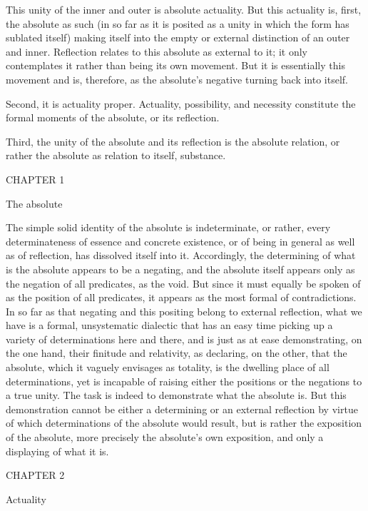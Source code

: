 This unity of the inner and outer is absolute actuality.
But this actuality is, first, the absolute as such
(in so far as it is posited as a unity
in which the form has sublated itself)
making itself into the empty or external
distinction of an outer and inner.
Reflection relates to this absolute
as external to it;
it only contemplates it
rather than being its own movement.
But it is essentially this movement
and is, therefore, as the absolute's
negative turning back into itself.

Second, it is actuality proper.
Actuality, possibility, and necessity constitute
the formal moments of the absolute,
or its reflection.

Third, the unity of the absolute
and its reflection is
the absolute relation,
or rather the absolute as
relation to itself, substance.

CHAPTER 1

The absolute

The simple solid identity of the absolute is indeterminate, or rather,
every determinateness of essence and concrete existence,
or of being in general as well as of reflection,
has dissolved itself into it.
Accordingly, the determining of what is
the absolute appears to be a negating,
and the absolute itself appears only as
the negation of all predicates, as the void.
But since it must equally be spoken of
as the position of all predicates,
it appears as the most formal of contradictions.
In so far as that negating and this positing
belong to external reflection,
what we have is a formal, unsystematic dialectic
that has an easy time picking up
a variety of determinations here and there,
and is just as at ease demonstrating, on the one hand,
their finitude and relativity, as declaring, on the other,
that the absolute, which it vaguely envisages as totality,
is the dwelling place of all determinations,
yet is incapable of raising either
the positions or the negations to a true unity.
The task is indeed to demonstrate what the absolute is.
But this demonstration cannot be either
a determining or an external reflection
by virtue of which determinations of the absolute would result,
but is rather the exposition of the absolute,
more precisely the absolute's own exposition,
and only a displaying of what it is.

CHAPTER 2

Actuality

